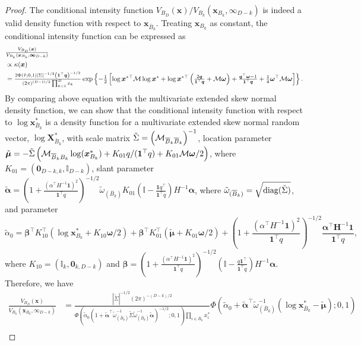 \documentclass[12pt]{article}
\begin{document}
\begin{proof}
The conditional intensity function $V_{B_D}(\bm x)/V_{B_k}(\bm x_{B_k},\bm \infty_{D-k})$ is indeed a valid density function \citep{Wadsworth.Tawn:2013} with respect to $\bm x_{\bar B_k}$. Treating $\bm x_{B_k}$ as constant, the conditional intensity function can be expressed as 
\begin{align*}
    & {\textstyle{V_{B_D}(\bm x)\over V_{B_k}(\bm x_{B_k},\bm \infty_{D-k})}} \\
    & \propto \kappa(\bm x) \\
    & = {\textstyle{2\Phi(\tilde{\tau};0,1)| \Sigma |^{-1/2} \left( \bm 1^\top \bm q\right)^{-1/2}\over\left( 2\pi \right)^{(D-1)/2}\prod_{k=1}^Dx_k}}\exp \left\{ -{\textstyle{1\over2}} \left[ \log \bm x^{*\top} {\mathcal M} \log \bm x^* + \log \bm x^{*\top} \left( {\textstyle{2 \bm q\over\bm 1^\top \bm q}}+{\mathcal M}\bm\omega\right) + {\textstyle{\bm q^\top\bm\omega - 1\over\bm 1 ^\top \bm q }} + {\textstyle{1\over4}}\bm\omega^\top{\mathcal M}\bm\omega \right]\right\}.
\end{align*}    
 By comparing above equation with the multivariate extended skew normal density function, we can show that the conditional intensity function with respect to $\log\bm x_{\bar B_k}^{*}$ is a density function for a multivariate  extended skew normal random vector, $\log\bm X_{\bar B_k}^{*}$, with scale matrix $\tilde\Sigma = \left({\mathcal M}_{{\overline{B}}_k{\overline{B}}_k}\right)^{-1}$, location parameter $\tilde{\bm\mu} = -\tilde\Sigma\left({\mathcal M}_{{\overline{B}}_kB_k}\log(\bm x_{B_k}^{*}) + K_{01}q/(\bm 1^\top q)+K_{01}{\mathcal M}\bm\omega/2\right)$, where $K_{01} = (\bm 0_{D-k,k},\mathbb I_{D-k})$, slant parameter $\tilde{\bm\alpha}=\left(1 + \frac{\left(\alpha^\top H^{-1}\bm 1\right)^2}{\bm 1^\top q}\right)^{-1/2}\tilde\omega_{(\bar B_k)} K_{01}\left(\mathbb{I} - \frac{\bm 1 q^\top}{\bm 1^\top q}\right) H^{-1}\bm\alpha$, where $\tilde\omega_{({\overline{B}}_k)}=\sqrt{{\rm diag}(\tilde\Sigma)}$, and parameter 
$$\tilde\alpha_0 = \bm\beta^\top K_{10}^\top(\log \bm x_{B_k}^{*}+K_{10}\bm\omega/2) + \bm\beta^\top K_{01}^\top(\tilde{\bm\mu} + K_{01}\bm\omega/2) +  \left(1 + \frac{(\alpha^\top H^{-1}\bm 1)^2}{\bm 1^\top q}\right)^{-1/2}\frac{\bm\alpha^\top\bm H^{-1}\bm 1}{\bm 1^\top q},$$ 
where $K_{10} = (\mathbb I_{k},\bm 0_{k,D-k})$ and
$\bm\beta = \left(1 + \frac{(\alpha^\top H^{-1}\bm 1)^2}{\bm 1^\top q}\right)^{-1/2}\left(\mathbb I - \frac{q\bm 1^\top}{\bm 1^\top q}\right) H^{-1}\bm\alpha.$
Therefore, we have
\begin{align*}
\frac{V_{B_D}(\bm x)}{V_{B_k}(\bm x_{B_k},\bm \infty_{D-k})} &= \frac{|\tilde\Sigma|^{-1/2}(2\pi)^{-(D-k)/2}}{\Phi\left(\tilde\alpha_0\left(1+\tilde{\bm\alpha}^\top\tilde\omega_{(\bar B_k)}^{-1}\tilde\Sigma\tilde\omega_{(\bar B_k)}^{-1}\tilde{\bm\alpha}\right)^{-1/2};0,1\right) \prod_{i\in\bar B_k}x_i^{*}} \Phi\left(\tilde\alpha_0 + \tilde{\bm\alpha}^\top\tilde\omega_{(\bar B_k)}^{-1}\left(\log \bm x_{\bar B_k}^{*} - \tilde{\bm\mu}\right);0,1\right) \\

\end{align*}
\end{proof}
\end{document}
